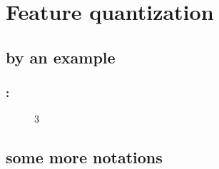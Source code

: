 \documentclass[english,xcolor={rgb,dvipsnames,table,usenames}]{beamer}
\begin{document}
 
% 
%
%
%
%
%
%
%
%
%






\section{Feature quantization}


\subsection{by an example}

{
\begin{frame}
\frametitle{\secname: \subsecname}

\begin{figure}[!ht]
\begin{animateinline}[poster=first, controls=all, palindrome, autopause, autoresume, width=\textwidth, height=6cm]{3}
%
\end{animateinline}
\end{figure}

\end{frame}
}


\subsection{some more notations}
\end{document}
